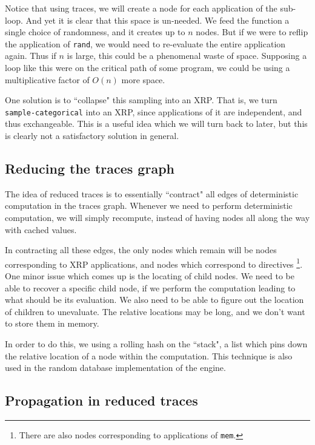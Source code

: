 \documentclass[10pt]{article}
\begin{document}
Notice that using traces, we will create a node for each application of the sub-loop.  And yet it is clear that this space is un-needed.  We feed the function a single choice of randomness, and it creates up to $n$ nodes.  But if we were to reflip the application of {\tt rand}, we would need to re-evaluate the entire application again.  Thus if $n$ is large, this could be a phenomenal waste of space.  Supposing a loop like this were on the critical path of some program, we could be using a multiplicative factor of $O(n)$ more space.  

One solution is to ``collapse" this sampling into an XRP.  That is, we turn {\tt sample-categorical} into an XRP, since applications of it are independent, and thus exchangeable.  This is a useful idea which we will turn back to later, but this is clearly not a satisfactory solution in general.  

\subsection{Reducing the traces graph}

The idea of reduced traces is to essentially ``contract" all edges of deterministic computation in the traces graph.  Whenever we need to perform deterministic computation, we will simply recompute, instead of having nodes all along the way with cached values.  

In contracting all these edges, the only nodes which remain will be nodes corresponding to XRP applications, and nodes which correspond to directives \footnote{There are also nodes corresponding to applications of {\tt mem}.}. \\

One minor issue which comes up is the locating of child nodes.  We need to be able to recover a specific child node, if we perform the computation leading to what should be its evaluation.  We also need to be able to figure out the location of children to unevaluate.  The relative locations may be long, and we don't want to store them in memory.

In order to do this, we using a rolling hash on the ``stack", a list which pins down the relative location of a node within the computation.  This technique is also used in the random database implementation of the engine.

\subsection{Propagation in reduced traces}
\end{document}

